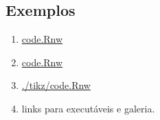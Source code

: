 
\subsection{Exemplos}

\begin{frame}
  \begin{enumerate}
  \item \href{run:./tikz/code.Rnw}{code.Rnw}
  \item \href{./tikz/code.Rnw}{code.Rnw}
  \item \url{./tikz/code.Rnw}
  \item links para executáveis e galeria.
  \end{enumerate}
\end{frame}

